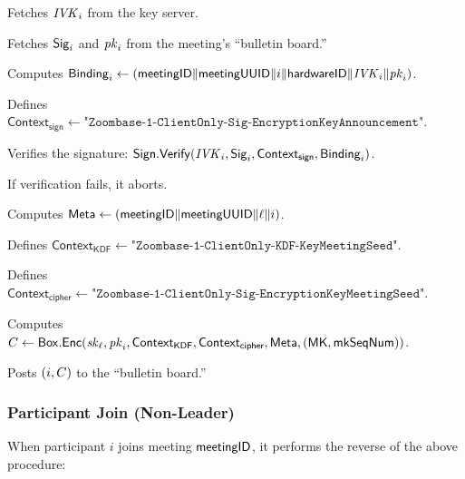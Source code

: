 \begingroup
\RaggedRight
\begin{enumerate*}
\item Fetches $\mathit{IVK}_i$ from the key server.
\item Fetches ${\sf Sig}_i$ and $\mathit{pk}_i$ from the meeting's ``bulletin board.''
\item Computes ${\sf Binding}_i \leftarrow \left( {\sf meetingID} \| \allowbreak {\sf meetingUUID} \| i \allowbreak
\| {\sf hardwareID} \| \mathit{IVK}_i \| \allowbreak \mathit{pk}_i \right)$.
\item Defines $\textsf{Context}_\textsf{sign} \leftarrow
\texttt{"Zoombase-1-ClientOnly-Sig-EncryptionKeyAnnouncement"}$.
\item Verifies the signature: ${\sf Sign}.\mathsf{Verify}(\mathit{IVK}_i, {\sf Sig}_i, \textsf{Context}_\textsf{sign},
{\sf Binding}_i)$.
\item If verification fails, it aborts.
\item Computes ${\sf Meta} \leftarrow \left( {\sf meetingID} \| \allowbreak {\sf meetingUUID} \| \allowbreak
\ell \| i \right)$.
\item Defines $\textsf{Context}_\textsf{KDF} \leftarrow
\texttt{"Zoombase-1-ClientOnly-KDF-KeyMeetingSeed"}$.
\item Defines $\textsf{Context}_\textsf{cipher} \leftarrow
\texttt{"Zoombase-1-ClientOnly-Sig-EncryptionKeyMeetingSeed"}$.
\item Computes $C \leftarrow {\sf Box}.\mathsf{Enc}(\mathit{sk}_\ell, \mathit{pk}_i, \textsf{Context}_\textsf{KDF},
    \textsf{Context}_\textsf{cipher}, {\sf Meta}, ({\sf MK}, \mathsf{mkSeqNum}))$.%
   \label{participantJoinRekeyStart}
\item Posts $(i, C)$ to the ``bulletin board.''%
   \label{participantJoinRekeyEnd}
\end{enumerate*}
\endgroup

\subsubsection{Participant Join (Non-Leader)}

When participant $i$ joins meeting ${\sf meetingID}$, it performs the reverse of the above procedure:

